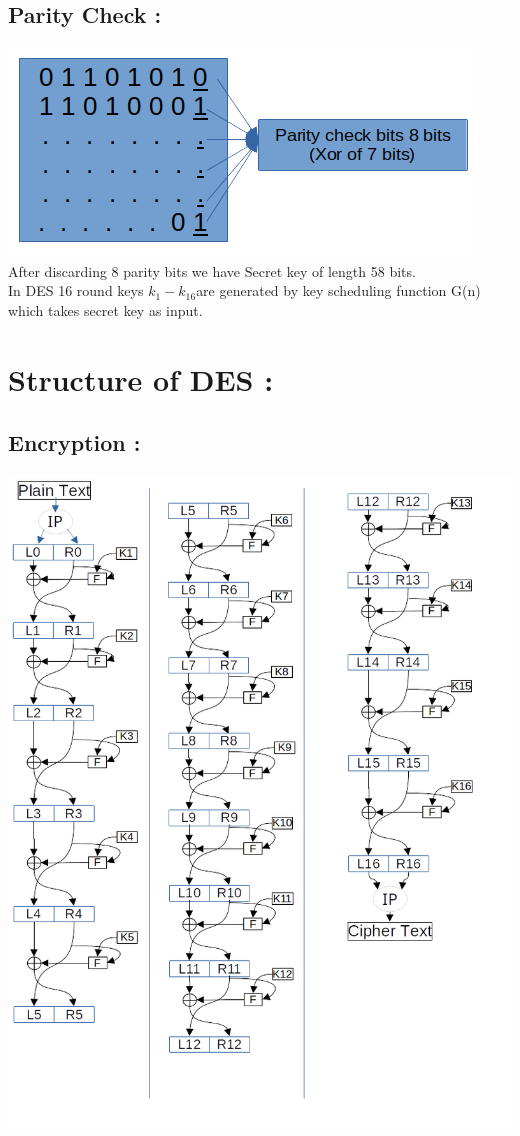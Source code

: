 \documentclass[11pt]{article}
\begin{document}
\subsection{Parity Check :}
\includegraphics{Images/L_5-6/Parity Check.png}\\
After discarding 8 parity bits we have Secret key of length 58 bits.\\
In DES 16 round keys $k_1-k_{16}$are generated by key scheduling function G(n) which takes secret key as input. 

\newpage

\section{Structure of DES : }
\subsection{Encryption :}
\includegraphics[scale=0.6]{Images/L_5-6/DES Structure.png}
\newpage
\end{document}
